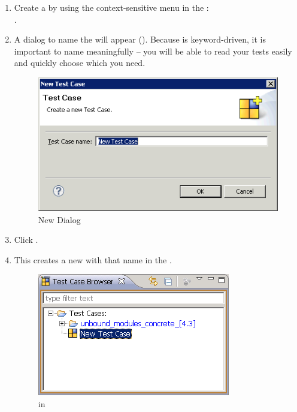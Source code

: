 \begin{enumerate}
\item Create a \gdcase{} by using the context-sensitive menu in the \gdtestcasebrowser{}:\\
.

\item A dialog to name the \gdcase{} will appear (). Because \app{} is keyword-driven, it is important to name \gdcases{} meaningfully --  you will be able to read your tests easily and quickly choose which \gdcase{} you need. 

\begin{figure}[h]
\begin{center}
\includegraphics[width=12.5cm]{Tasks/Testcases/PS/newtestcasedialog}
\caption{New \gdcase{} Dialog}
\label{newtestcasedialog}
\end{center}
\end{figure} 

\item Click . 
\item This creates a new \gdcase{} with that name in the \gdtestcasebrowser{} .

\begin{figure}[h]
\begin{center}
\includegraphics{Tasks/Testcases/PS/newtestcaseinbrowser}
\caption{\gdcase{} in \gdtestcasebrowser{}}
\label{newtestcaseinbrowser}
\end{center}
\end{figure} 

\end{enumerate}

